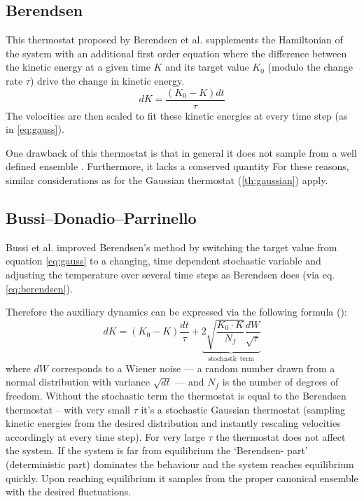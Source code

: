 
\subsection{Berendsen}
This thermostat proposed by Berendsen et al. \cite{Berendsen1984} supplements the Hamiltonian of the system with an additional first order equation where the difference between the kinetic energy at a given time $K$ and its target value $K_0$ (modulo the change rate $\tau$) drive the change in kinetic energy.
\begin{equation}
{dK} = \frac{(K_0-K)dt}{\tau} \label{eq:berendsen}%
\end{equation}
The velocities are then scaled to fit these kinetic energies at every time step (as in \eqref{eq:gauss}).

One drawback of this thermostat is that in general it does not sample from a well defined ensemble \cite{Morishita2000}. Furthermore, it lacks a conserved quantity \cite{Bussi2007} For these reasons, similar considerations as for the Gaussian thermostat (\ref{th:gaussian}) apply.
\subsection{Bussi--Donadio--Parrinello}
Bussi et al.\cite{Bussi2007} improved Berendsen's method by switching the target value from equation \eqref{eq:gauss} to a changing, time dependent stochastic variable and adjusting the temperature over several time steps as Berendsen does (via eq. \eqref{eq:berendsen}). 

Therefore the auxiliary dynamics can be expressed via the following formula ():
\begin{equation}
dK = (K_0- K) \frac{dt}{\tau} + \underbrace{2\sqrt{\frac{K_0\cdot K}{N_f}}\frac{dW}{\sqrt{\tau}}}_{\text{stochastic term}}
\end{equation}
where $dW$ corresponds to a Wiener noise --- a random number drawn from a normal distribution with variance $\sqrt{dt}$ --- and $N_f$ is the number of degrees of freedom. 
Without the stochastic term the thermostat is equal to the Berendsen thermostat -- with very small $\tau$ it's a stochastic Gaussian thermostat (sampling kinetic energies from the desired distribution and instantly rescaling velocities accordingly at every time step). For very large $\tau$ the thermostat does not affect the system. If the system is far from equilibrium the `Berendsen- part' (deterministic part) dominates the behaviour and the system reaches equilibrium quickly. Upon reaching equilibrium it samples from the proper canonical ensemble with the desired fluctuations.

